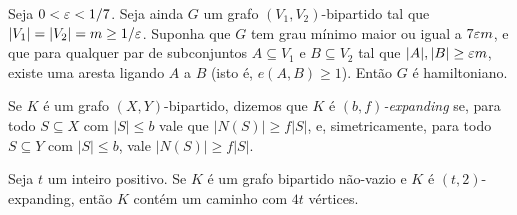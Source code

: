 \begin{lema}\label{lema:haxell}
	Seja $0<\varepsilon<1/7$. Seja ainda $G$ um grafo $(V_1, V_2)$-bipartido tal que $|V_1| = |V_2| = m\geq1/\varepsilon$. Suponha que $G$ tem grau mínimo maior ou igual a $7\varepsilon m$, e que para qualquer par de subconjuntos $A\subseteq V_1$ e $B\subseteq V_2$ tal que $|A|,|B|\geq \varepsilon m$, existe uma aresta ligando $A$ a $B$ (isto é, $e(A, B)\geq1$). Então $G$ é hamiltoniano.
\end{lema}

\begin{defi}
	Se $K$ é um grafo $(X,Y)$-bipartido, dizemos que $K$ é \emph{$(b,f)$-expanding} se, para todo $S\subseteq X$ com $|S|\leq b$ vale que $|N(S)|\geq f|S|$, e, simetricamente, para todo $S\subseteq Y$ com $|S|\leq b$, vale $|N(S)|\geq f|S|$.
\end{defi}

\begin{prop}
	Seja $t$ um inteiro positivo. Se $K$ é um grafo bipartido não-vazio e $K$ é $(t,2)$-expanding, então $K$ contém um caminho com $4t$ vértices.
\end{prop}

